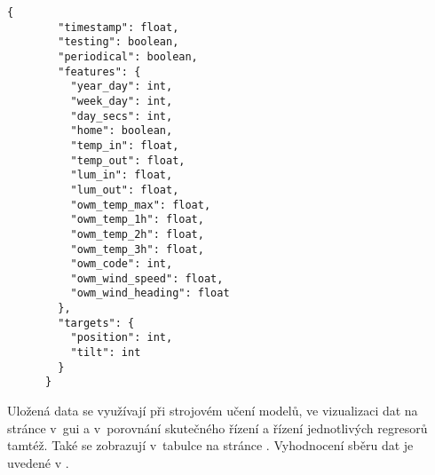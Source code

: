     \begin{lstlisting}[caption={[Struktura vzorku v~databázi]Struktura vzorku dat uloženého jako záznam v~databázi MongoDB. Obsahuje hodnoty příznaků i stav žaluzií v~okamžiku jeho pořízení a časovou známku. Místo hodnot jsou zde uvedeny jejich datové typy (\code{float} - číslo s plovoucí řádovou čárkou, \code{boolean} - pravdivostní hodnota, \code{int} - celé číslo)},captionpos=b,label=lst:datum]
      {
        "timestamp": float,
        "testing": boolean,   
        "periodical": boolean,
        "features": {
          "year_day": int,
          "week_day": int,
          "day_secs": int,
          "home": boolean,
          "temp_in": float,
          "temp_out": float,
          "lum_in": float,
          "lum_out": float,
          "owm_temp_max": float,
          "owm_temp_1h": float,
          "owm_temp_2h": float,
          "owm_temp_3h": float,
          "owm_code": int,
          "owm_wind_speed": float,
          "owm_wind_heading": float
        },
        "targets": {
          "position": int,         
          "tilt": int
        }
      }
    \end{lstlisting}

    Uložená data se využívají při strojovém učení modelů, ve vizualizaci dat na stránce  v~\acrshort{gui} a v~porovnání skutečného řízení a řízení jednotlivých regresorů tamtéž. Také se zobrazují v~tabulce na stránce . Vyhodnocení sběru dat je uvedené v .


